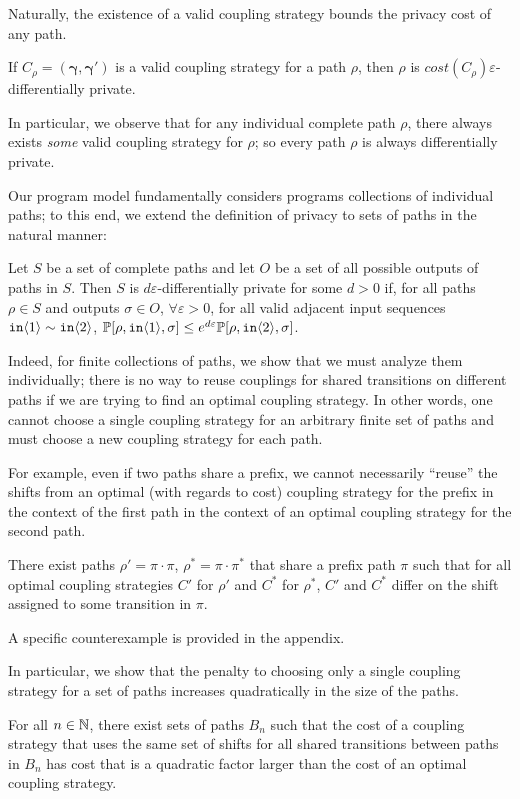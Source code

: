 Naturally, the existence of a valid coupling strategy bounds the privacy cost of any path. 

\begin{cor}
    If $C_\rho=(\bm{\gamma}, \bm{\gamma}')$ is a valid coupling strategy for a path $\rho$, then $\rho$ is $cost(C_\rho)\varepsilon$-differentially private.
\end{cor}

In particular, we observe that for any individual complete path $\rho$, there always exists \textit{some} valid coupling strategy for $\rho$; so every path $\rho$ is always differentially private. 

Our program model fundamentally considers programs collections of individual paths; to this end, we extend the definition of privacy to sets of paths in the natural manner:

\begin{defn}
  Let $S$ be a set of complete paths and let $O$ be a set of all possible outputs of paths in $S$. 
  Then $S$ is $d\varepsilon$-differentially private for some $d>0$ if, for all paths $\rho\in S$ and outputs $\sigma\in O$, $\forall \varepsilon>0$, for all valid adjacent input sequences $\texttt{in}\langle1 \rangle\sim \texttt{in}\langle2 \rangle$, $\mathbb{P}[\rho, \texttt{in}\langle1 \rangle, \sigma]\leq e^{d\varepsilon}\mathbb{P}[\rho, \texttt{in}\langle2 \rangle, \sigma]$.
\end{defn}

Indeed, for finite collections of paths, we show that we must analyze them individually; there is no way to reuse couplings for shared transitions on different paths if we are trying to find an optimal coupling strategy. In other words, one cannot choose a single coupling strategy for an arbitrary finite set of paths and must choose a new coupling strategy for each path.

For example, even if two paths share a prefix, we cannot necessarily ``reuse'' the shifts from an optimal (with regards to cost) coupling strategy for the prefix in the context of the first path in the context of an optimal coupling strategy for the second path. 

\begin{prop}\label{noSharingStrategiesProp}
  There exist paths $\rho'=\pi\cdot \pi$, $\rho^*=\pi\cdot\pi^*$ that share a prefix path $\pi$ such that for all optimal coupling strategies $C'$ for $\rho'$ and $C^*$ for $\rho^*$, $C'$ and $C^*$ differ on the shift assigned to some transition in $\pi$. 
\end{prop}

A specific counterexample is provided in the appendix. 

In particular, we show that the penalty to choosing only a single coupling strategy for a set of paths increases quadratically in the size of the paths.

\begin{prop}
  For all $n\in \mathbb{N}$, there exist sets of paths $B_n$ such that the cost of a coupling strategy that uses the same set of shifts for all shared transitions between paths in $B_n$ has cost that is a quadratic factor larger than the cost of an optimal coupling strategy. 
\end{prop}



